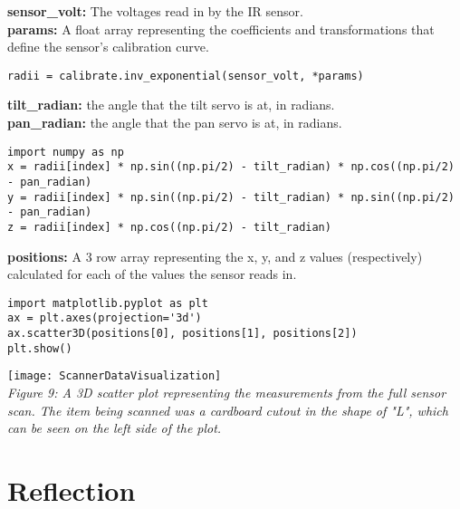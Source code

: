 \documentclass{article}
\begin{document}
    \begin{tcolorbox}
    \textbf{sensor\_volt:} The voltages read in by the IR sensor. \\
    \textbf{params:} A float array representing the coefficients and transformations that define the sensor's calibration curve.
\begin{verbatim}
radii = calibrate.inv_exponential(sensor_volt, *params)
\end{verbatim}
    \end{tcolorbox}


    \begin{tcolorbox}
    \textbf{tilt\_radian:} the angle that the tilt servo is at, in radians. \\
    \textbf{pan\_radian:} the angle that the pan servo is at, in radians.
\begin{verbatim}
import numpy as np
x = radii[index] * np.sin((np.pi/2) - tilt_radian) * np.cos((np.pi/2) - pan_radian)
y = radii[index] * np.sin((np.pi/2) - tilt_radian) * np.sin((np.pi/2) - pan_radian)
z = radii[index] * np.cos((np.pi/2) - tilt_radian)
\end{verbatim}
    \end{tcolorbox}


    \begin{tcolorbox}
    \textbf{positions:} A 3 row array representing the x, y, and z values (respectively) calculated for each of the values the sensor reads in.
\begin{verbatim}
import matplotlib.pyplot as plt
ax = plt.axes(projection='3d')
ax.scatter3D(positions[0], positions[1], positions[2])
plt.show()
\end{verbatim}
    \end{tcolorbox}

    
    \begin{center}
        \texttt{[image: ScannerDataVisualization]}
        \\
        \textit{Figure 9: A 3D scatter plot representing the measurements from the full sensor scan. The item being scanned was a cardboard cutout in the shape of "L", which can be seen on the left side of the plot.}
    \end{center}


\section{Reflection}
\end{document}
